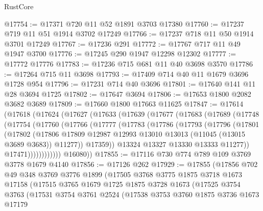 \begin{lexlean}{RustCore}
\begin{coremodule}
@17754 := @17371 @720 @11 @52 @1891 @3703 @17380
@17760 := @17237 @719 @11 @51 @1914 @3702 @17249
@17766 := @17237 @718 @11 @50 @1914 @3701 @17249
@17767 := @17236 @291
@17772 := @17767 @717 @11 @49 @1947 @3700
@17776 := @17245 @290 @1947 @12298 @12302
@17777 := @17772 @17776
@17783 := @17236 @715 @681 @11 @40 @3698 @3570
@17786 := @17264 @715 @11 @3698
@17793 := @17409 @714 @40 @11 @1679 @3696 @1728 @954
@17796 := @17231 @714 @40 @3696
@17801 := @17640 @141 @11 @28 @3694 @1725
@17802 := @17647 @3694
@17806 := @17653 @1800 @2082 @3682 @3689
@17809 := @17660 @1800 @17663 @11625
@17847 := @17614
    (@17618
      (@17624
        (@17627
          (@17633
            (@17639
              (@17677
                (@17683
                  (@17689
                    (@17748
                      (@17754
                        (@17760
                          (@17766
                            (@17777
                              (@17783
                                (@17786
                                  (@17793
                                    (@17796
                                      (@17801
                                        (@17802
                                          (@17806
                                            @17809
                                            @12987
                                            @12993
                                            @13010
                                            @13013
                                            (@11045 (@13015 @3689 @3683))
                                            @11277))
                                        @17359))
                                    @13324
                                    @13327
                                    @13330
                                    @13333
                                    @11277))
                                @17471))))))))))))
        @16080))
@17855 := @17116 @730 @774 @789 @109 @3769 @3778 @1679 @4140
@17856 := @17126 @262
@17929 := @17855
    (@17856
      @702
      @49
      @348
      @3769
      @3776
      @1899
      (@17505
        @3768
        @3775
        @1875
        @3718
        @1673
        @17158
        (@17515
          @3765
          @1679
          @1725
          @1875
          @3728
          @1673
          (@17525
            @3754
            @3763
            (@17531
              @3754
              @3761
              @2524
              (@17538
                @3753
                @3760
                @1875
                @3736
                @1673
                @17179

\end{coremodule}
\end{lexlean}
